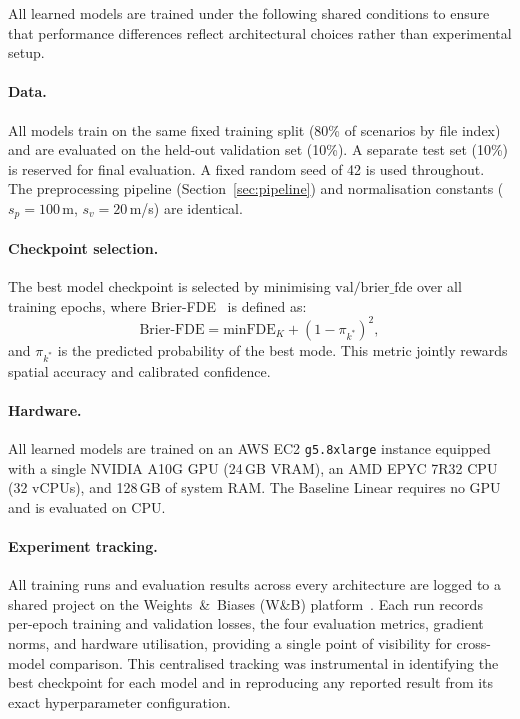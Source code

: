 \documentclass[12pt, a4paper]{article}
\begin{document}
All learned models are trained under the following shared conditions to
ensure that performance differences reflect architectural choices rather
than experimental setup.

\paragraph{Data.}
All models train on the same fixed training split (80\% of scenarios
by file index) and are evaluated on the held-out validation set (10\%).
A separate test set (10\%) is reserved for final evaluation.
A fixed random seed of 42 is used throughout.
The preprocessing pipeline (Section~\ref{sec:pipeline}) and
normalisation constants ($s_p = 100$\,m, $s_v = 20$\,m/s) are identical.

\paragraph{Checkpoint selection.}
The best model checkpoint is selected by minimising
$\text{val/brier\_fde}$ over all training epochs, where
Brier-FDE~\citep{feng2024unitraj} is defined as:
\begin{equation}
  \text{Brier-FDE} = \text{minFDE}_K + (1 - \pi_{k^*})^2,
  \label{eq:brier_fde}
\end{equation}
and $\pi_{k^*}$ is the predicted probability of the best mode.
This metric jointly rewards spatial accuracy and calibrated confidence.

\paragraph{Hardware.}
All learned models are trained on an AWS EC2 \texttt{g5.8xlarge} instance
equipped with a single NVIDIA A10G GPU (24\,GB VRAM),
an AMD EPYC 7R32 CPU (32 vCPUs), and 128\,GB of system RAM.
The Baseline Linear requires no GPU and is evaluated on CPU.

\paragraph{Experiment tracking.}
All training runs and evaluation results across every architecture are logged to a shared project on the Weights~\&~Biases (W\&B)
platform~\citep{wandb2020}.  Each run records per-epoch training and validation
losses, the four evaluation metrics, gradient norms, and hardware utilisation,
providing a single point of visibility for cross-model comparison.  This
centralised tracking was instrumental in identifying the best checkpoint for each
model and in reproducing any reported result from its exact hyperparameter
configuration.
\end{document}
